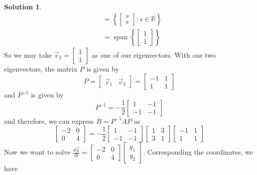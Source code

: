 \documentclass[11pt]{article}
\theoremstyle{definition}\newtheorem{definition}{Definition}
\theoremstyle{definition}\newtheorem{question}{Question}
\theoremstyle{definition}\newtheorem*{solution}{Solution}
\theoremstyle{definition}\newtheorem{example}{Example}
\theoremstyle{definition}\newtheorem{notation}{Notation}
\theoremstyle{theorem}\newtheorem{theorem}{Theorem}
\theoremstyle{theorem}\newtheorem{corollary}{Corollary}
\theoremstyle{theorem}\newtheorem{lemma}{Lemma}
\theoremstyle{theorem}\newtheorem{proposition}{Proposition}
\newcommand{\R}{\mathbb{R}}
\DeclareMathOperator{\Span}{span}
\begin{document}
\begin{solution}
\begin{align*}
        &= \left\{\begin{bmatrix} s \\ s \end{bmatrix} : s \in \R\right\} \\
        &= \Span\left\{\begin{bmatrix} 1 \\ 1 \end{bmatrix}\right\}
    \end{align*}
    So we may take $\vec{v}_2 = \begin{bmatrix} 1 \\ 1 \end{bmatrix}$ as one of our eigenvectors. With our two eigenvectors, the matrix $P$ is given by
    \begin{equation*}
        P = \begin{bmatrix} \vec{v}_1 & \vec{v}_2 \end{bmatrix} = \begin{bmatrix} -1 & 1 \\ 1 & 1 \end{bmatrix}
    \end{equation*}
    and $P^{-1}$ is given by
    \begin{equation*}
        P^{-1} = -\frac{1}{2}\begin{bmatrix} 1 & -1 \\ -1 & -1 \end{bmatrix}
    \end{equation*}
    and therefore, we can express $B = P^{-1}AP$ as
    \begin{equation*}
        \begin{bmatrix} -2 & 0 \\ 0 & 4 \end{bmatrix} = -\frac{1}{2}\begin{bmatrix} 1 & -1 \\ -1 & -1 \end{bmatrix} \begin{bmatrix} 1 & 3 \\ 3 & 1 \end{bmatrix} \begin{bmatrix} -1 & 1 \\ 1 & 1 \end{bmatrix}
    \end{equation*}
    Now we want to solve $\frac{d\vec{y}}{dt} = \begin{bmatrix} -2 & 0 \\ 0 & 4 \end{bmatrix} \begin{bmatrix} y_1 \\ y_2 \end{bmatrix}$. Corresponding the coordinates, we have

\end{solution}
\end{document}
